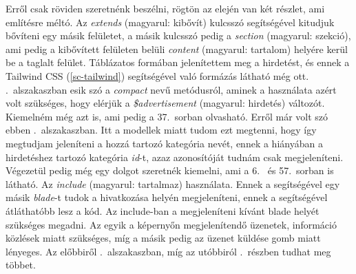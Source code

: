 \documentclass[]{thesis-ekf}
\theoremstyle{definition}
\theoremstyle{remark}
\begin{document}
		Erről csak röviden szeretnénk beszélni, rögtön az elején van két részlet, ami említésre méltó. Az \emph{extends} (magyarul: kibővít) kulcsszó segítségével kitudjuk bővíteni egy másik felületet, a másik kulcsszó pedig a \emph{section} (magyarul: szekció), ami pedig a kibővített felületen belüli \emph{content} (magyarul: tartalom) helyére kerül be a taglalt felület. Táblázatos formában jelenítettem meg a hirdetést, és ennek a Tailwind CSS (\ref{sc-tailwind}) segítségével való formázás látható még ott. .~alszakaszban esik szó a \emph{compact} nevű metódusról, aminek a használata azért volt szükséges, hogy elérjük a \emph{\$advertisement} (magyarul: hirdetés) változót. Kiemelném még azt is, ami pedig a 37.~sorban olvasható. Erről már volt szó ebben .~alszakaszban. Itt a modellek miatt tudom ezt megtenni, hogy így megtudjam jeleníteni a hozzá tartozó kategória nevét, ennek a hiányában a hirdetéshez tartozó kategória \emph{id}-t, azaz azonosítóját tudnám csak megjeleníteni. Végezetül pedig még egy dolgot szeretnék kiemelni, ami a 6.~ és 57.~sorban is látható. Az \emph{include} (magyarul: tartalmaz) használata. Ennek a segítségével egy másik \emph{blade}-t tudok a hivatkozása helyén megjeleníteni, ennek a segítségével átláthatóbb lesz a kód. Az include-ban a megjeleníteni kívánt blade helyét szükséges megadni. Az egyik a képernyőn megjelenítendő üzenetek, információ közlések miatt szükséges, míg a másik pedig az üzenet küldése gomb miatt lényeges. Az előbbiről .~alszakaszban, míg az utóbbiról .~részben tudhat meg többet.
\end{document}
